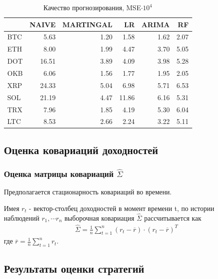 \documentclass{beamer}
\begin{document}
\begin{frame}
    \begin{table}[h]
    \caption{Качество прогнозирования, MSE$\cdot 10^4$}
        \label{tab:ml_eval_metrics}
        \begin{tabular}{lrrrrr}
            \toprule
            & NAIVE & MARTINGAL & LR & ARIMA & RF \\
            \midrule
            BTC & 5.63 & 1.20 & 1.58 & 1.62 & 2.07 \\
            ETH & 8.00 & 1.99 & 4.47 & 3.70 & 5.05 \\
            DOT & 16.51 & 3.89 & 4.09 & 3.98 & 5.28 \\
            OKB & 6.06 & 1.56 & 1.77 & 1.95 & 2.05 \\
            XRP & 24.33 & 5.04 & 6.98 & 5.71 & 6.53 \\
            SOL & 21.19 & 4.47 & 11.86 & 6.16 & 5.31 \\
            TRX & 7.96 & 1.85 & 4.19 & 5.30 & 6.04 \\
            LTC & 8.53 & 2.66 & 2.24 & 3.22 & 5.11 \\
            \bottomrule
        \end{tabular}
    \end{table}
\end{frame}

\subsection{Оценка ковариаций доходностей}

\begin{frame}
    \frametitle{Оценка матрицы ковариаций $\hat{\Sigma}$}
    Предполагается стационарность ковариаций во времени.

    Имея $r_t$ - вектор-столбец доходностей в момент времени t, по истории наблюдений $r_1, \cdots r_n$ 
    выборочная ковариация $\hat{\Sigma}$ рассчитывается как 
    \begin{align*}
        \hat{\Sigma} = \frac{1}{n} \sum_{t=1}^{n}(r_t - \overline{r}) \cdot (r_t - \overline{r})^T
    \end{align*}
    где $\overline{r} = \frac{1}{n} \sum_{t=1}^{n} r_t$.    
\end{frame}

\subsection{Результаты оценки стратегий}
\end{document}
